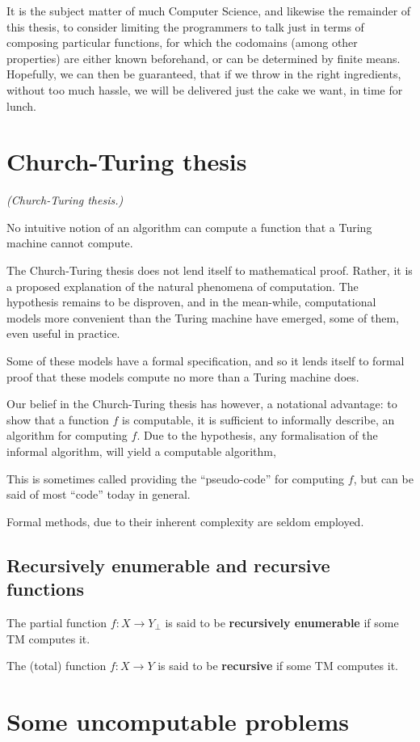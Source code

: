 It is the subject matter of much Computer Science, and likewise the remainder
of this thesis, to consider limiting the programmers to talk just in terms of
composing particular functions, for which the codomains (among other
properties) are either known beforehand, or can be determined by finite means.
Hopefully, we can then be guaranteed, that if we throw in the right
ingredients, without too much hassle, we will be delivered just the cake we
want, in time for lunch.

\section{Church-Turing thesis}

\begin{hypothesis} \textit{(Church-Turing thesis.)}

No intuitive notion of an algorithm can compute a function that a Turing
machine cannot compute.

\end{hypothesis}

The Church-Turing thesis does not lend itself to mathematical proof. Rather, it
is a proposed explanation of the natural phenomena of computation. The
hypothesis remains to be disproven, and in the mean-while, computational models
more convenient than the Turing machine have emerged, some of them, even useful
in practice.

Some of these models have a formal specification, and so it lends itself to
formal proof that these models compute no more than a Turing machine does.

Our belief in the Church-Turing thesis has however, a notational advantage: to
show that a function $f$ is computable, it is sufficient to informally
describe, an algorithm for computing $f$. Due to the hypothesis, any
formalisation of the informal algorithm, will yield a computable algorithm,

This is sometimes called providing the ``pseudo-code'' for computing $f$, but can be said
of most ``code'' today in general.

Formal methods, due to their inherent complexity are seldom employed.


\subsection{Recursively enumerable and recursive functions}

\begin{definition} The partial function $f:X\rightarrow Y_\bot$ is said to be
\textbf{recursively enumerable} if some TM computes it. \end{definition}

\begin{definition} The (total) function $f:X\rightarrow Y$ is said to be
\textbf{recursive} if some TM computes it. \end{definition}

\section{Some uncomputable problems}
